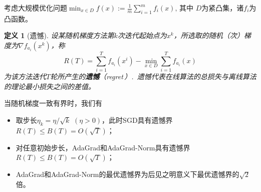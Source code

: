 \documentclass[9pt,aspectratio=169]{beamer}
\newtheorem{defi}{定义}
\begin{document}
\begin{frame}
考虑大规模优化问题$\min_{x\in D} f(x):=\frac{1}{m}\sum_{i=1}^{m}f_i(x),\,$其中
$D$为紧凸集，诸$f_i$为凸函数。
\begin{defi}[遗憾]
设某随机梯度方法第$k$次迭代起始点为$x^k$，所选取的随机（次）梯度为$\nabla f_{a_i}(x^k)$，称
\begin{equation}\label{yihandingyi}
    R(T)=\sum_{i=1}^{T} f_{a_i}(x^i) -\min_{x\in D}\sum_{i=1}^{T} f_{a_i}(x) 
\end{equation}
为该方法迭代$T$轮所产生的\textbf{遗憾}（\textrm{regret}\,）.\ 遗憾代表在线算法的总损失与离线算法的理论最小损失之间的差值。
\end{defi}
\vspace{0.2cm}

当随机梯度一致有界时，我们有
\vspace{0.2cm}
\begin{itemize}
	\item 取步长$\eta_k=\eta/\sqrt{k}\,\,(\eta>0)$，此时SGD具有遗憾界$R(T)\leq B(T)=O(\sqrt{T})$；
	\item 对任意初始步长，AdaGrad和AdaGrad-Norm具有遗憾界$R(T)\leq B(T)=O(\sqrt{T})$；
    \item AdaGrad和AdaGrad-Norm的最优遗憾界为后见之明意义下最优遗憾界的$\sqrt{2}$倍。
\end{itemize}

\end{frame}
\end{document}
